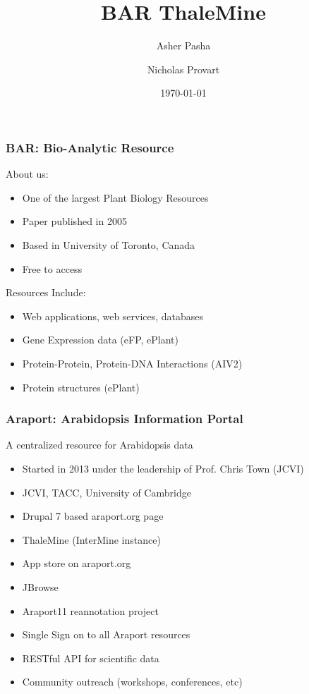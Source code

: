 \documentclass{beamer}
\begin{document}
\title[BAR ThaleMine] 
{BAR ThaleMine}
\author[Pasha, Provart]
{Asher Pasha \and Nicholas Provart}
\date{\today}

\frame{\titlepage}

\begin{frame}
    \frametitle{BAR: Bio-Analytic Resource}
    About us:
    \begin{itemize}
        \item One of the largest Plant Biology Resources
        \item Paper published in 2005
        \item Based in University of Toronto, Canada
        \item Free to access
    \end{itemize}
    Resources Include:
    \begin{itemize}
        \item Web applications, web services, databases
        \item Gene Expression data (eFP, ePlant)
        \item Protein-Protein, Protein-DNA Interactions (AIV2)
        \item Protein structures (ePlant)
    \end{itemize}
\end{frame}

\begin{frame}
    \frametitle{Araport: Arabidopsis Information Portal}
    A centralized resource for Arabidopsis data
    \begin{itemize}
        \item Started in 2013 under the leadership of Prof. Chris Town (JCVI)
        \item JCVI, TACC, University of Cambridge
        \item Drupal 7 based araport.org page
        \item ThaleMine (InterMine instance)
        \item App store on araport.org
        \item JBrowse
        \item Araport11 reannotation project
        \item Single Sign on to all Araport resources
        \item RESTful API for scientific data
        \item Community outreach (workshops, conferences, etc)
    \end{itemize}
\end{frame}
\end{document}
